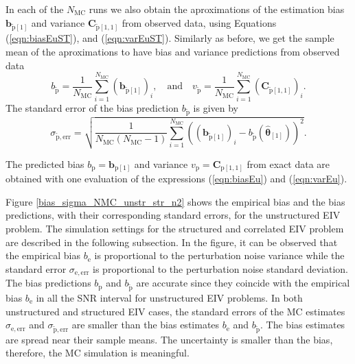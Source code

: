 In each of the $N_{\mathrm{MC}}$ runs we also obtain the aproximations of the estimation bias $\mathbf{b}_{\widetilde{\mathrm{p}} \left[1\right]}$ and variance $\mathbf{C}_{\widetilde{\mathrm{p}} \left[1,1\right]}$  from observed data, using Equations (\ref{eqn:biasEuST}), and (\ref{eqn:varEuST}).
Similarly as before, we get the sample mean of the aproximations to have bias and variance predictions from observed data 
 \begin{equation} b_{\widetilde{\mathrm{p}}} = \frac{1}{N_{\mathrm{MC}}} \sum_{i=1}^{N_{\mathrm{MC}}}{ \left( \mathbf{b}_{\widetilde{\mathrm{p}} \left[1\right]} \right)_i } , \quad \mathrm{and} 
 \quad v_{\widetilde{\mathrm{p}}}  = \frac{1}{N_{\mathrm{MC}}} \sum_{i=1}^{N_{\mathrm{MC}}}{ \left( \mathbf{C}_{\widetilde{\mathrm{p}} \left[1,1\right]} \right)_i } . \end{equation} 
The standard error of the bias prediction $b_{\widetilde{\mathrm{p}}}$ is given by
\begin{equation} \sigma_{\widetilde{\mathrm{p}}, \mathrm{err}} = \sqrt{ \frac{1}{N_{\mathrm{MC}} \left( N_{\mathrm{MC}}-1 \right)} \sum_{i=1}^{N_{\mathrm{MC}}} { \left( \left( \mathbf{b}_{\widetilde{\mathrm{p}} \left[1\right]} \right)_i - b_{\widetilde{\mathrm{p}}} \left( \widehat{\bm{\theta}}_{\left[1\right]} \right) \right)^2 } } . \end{equation}

The predicted bias $b_{\mathrm{p}} = \mathbf{b}_{\mathrm{p} \left[1\right]}$ and variance $v_{\mathrm{p}} = \mathbf{C}_{\mathrm{p} \left[1,1\right]}$ from exact data are obtained with one evaluation of the expressions (\ref{eqn:biasEu}) and (\ref{eqn:varEu}). %

Figure \ref{bias_sigma_NMC_unstr_str_n2} shows the empirical bias and the bias predictions, with their corresponding standard errors, \color{blue} for the unstructured EIV problem\color{black}.
The simulation settings for the structured and correlated EIV problem are described in the following subsection.
In the figure, it can be observed that the empirical bias $b_\mathrm{e}$ is proportional to the perturbation noise variance while the standard error $\sigma_\mathrm{e, err}$ is proportional to the perturbation noise standard deviation.
The bias predictions $b_\mathrm{p}$ and $b_{\widetilde{\mathrm{p}}}$ are accurate since they coincide with the empirical bias $b_\mathrm{e}$ in all the SNR interval for unstructured EIV problems. 
In both unstructured and structured EIV cases, the standard errors of the MC estimates $\sigma_{\mathrm{e, err}}$ and $\sigma_{\widetilde{\mathrm{p}}, \mathrm{err}}$ are smaller than the bias estimates $b_{\mathrm{e}}$ and $b_{\widetilde{\mathrm{p}}}$.
The bias estimates are spread near their sample means. 
The uncertainty is smaller than the bias, therefore, the MC simulation is meaningful.

